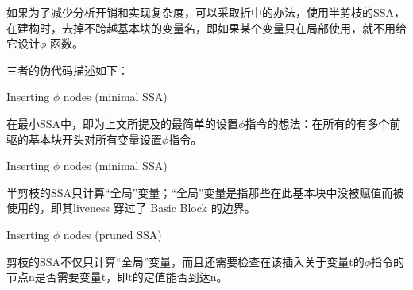 如果为了减少分析开销和实现复杂度，可以采取折中的办法，使用半剪枝的SSA，在建构时，去掉不跨越基本块的变量名，即如果某个变量只在局部使用，就不用给它设计$\phi$ 函数。

三者的伪代码描述如下：

\begin{algorithm}[htb]
  \small
  \SetAlgoLined
  \caption{Inserting $\phi$ nodes (minimal SSA)}
  \label{algo:minissa}
\end{algorithm}

在最小SSA中，即为上文所提及的最简单的设置$\phi$指令的想法：在所有的有多个前驱的基本块开头对所有变量设置$\phi$指令。

\begin{algorithm}[htb]
  \small
  \SetAlgoLined
  \caption{Inserting $\phi$ nodes (minimal SSA)}
  \label{algo:halfprunedssa}
\end{algorithm}

半剪枝的SSA只计算“全局”变量；“全局”变量是指那些在此基本块中没被赋值而被使用的，即其liveness 穿过了 Basic Block 的边界。

\begin{algorithm}[htb]
  \small
  \SetAlgoLined
  \caption{Inserting $\phi$ nodes (pruned SSA)}
  \label{algo:prunedssa}
\end{algorithm}

剪枝的SSA不仅只计算“全局”变量，而且还需要检查在该插入关于变量t的$\phi$指令的节点n是否需要变量t，即t的定值能否到达n。

